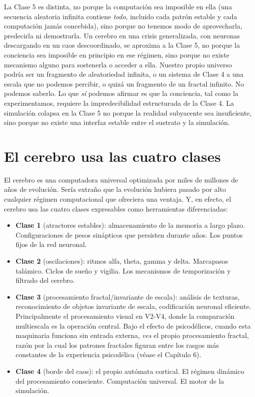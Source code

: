 \documentclass[11pt, twoside, openright]{book}
\begin{document}
La Clase 5 es distinta, no porque la computación sea imposible en ella (una secuencia aleatoria infinita contiene \textit{todo}, incluido cada patrón estable y cada computación jamás concebida), sino porque no tenemos modo de aprovecharla, predecirla ni demostrarla. Un cerebro en una crisis generalizada, con neuronas descargando en un caos descoordinado, se aproxima a la Clase 5, no porque la conciencia sea imposible en principio en ese régimen, sino porque no existe mecanismo alguno para sostenerla o acceder a ella. Nuestro propio universo podría ser un fragmento de aleatoriedad infinita, o un sistema de Clase 4 a una escala que no podemos percibir, o quizá un fragmento de un fractal infinito. No podemos saberlo. Lo que \textit{sí} podemos afirmar es que la conciencia, tal como la experimentamos, requiere la impredecibilidad estructurada de la Clase 4. La simulación colapsa en la Clase 5 no porque la realidad subyacente sea insuficiente, sino porque no existe una interfaz estable entre el sustrato y la simulación.

\section*{El cerebro usa las cuatro clases}

El cerebro es una computadora universal optimizada por miles de millones de años de evolución. Sería extraño que la evolución hubiera pasado por alto cualquier régimen computacional que ofreciera una ventaja. Y, en efecto, el cerebro usa las cuatro clases expresables como herramientas diferenciadas:

\begin{itemize}
  \item \textbf{Clase 1} (atractores estables): almacenamiento de la memoria a largo plazo. Configuraciones de pesos sinápticos que persisten durante años. Los puntos fijos de la red neuronal.
  \item \textbf{Clase 2} (oscilaciones): ritmos alfa, theta, gamma y delta. Marcapasos talámico. Ciclos de sueño y vigilia. Los mecanismos de temporización y filtrado del cerebro.
  \item \textbf{Clase 3} (procesamiento fractal/\allowbreak{}invariante de escala): análisis de texturas, reconocimiento de objetos invariante de escala, codificación neuronal eficiente. Principalmente el procesamiento visual en V2-V4, donde la comparación multiescala es la operación central. Bajo el efecto de psicodélicos, cuando esta maquinaria funciona sin entrada externa, \textit{ves} el propio procesamiento fractal, razón por la cual los patrones fractales figuran entre los rasgos más constantes de la experiencia psicodélica (véase el Capítulo 6).
  \item \textbf{Clase 4} (borde del caos): el propio autómata cortical. El régimen dinámico del procesamiento consciente. Computación universal. El motor de la simulación.
\end{itemize}
\end{document}
